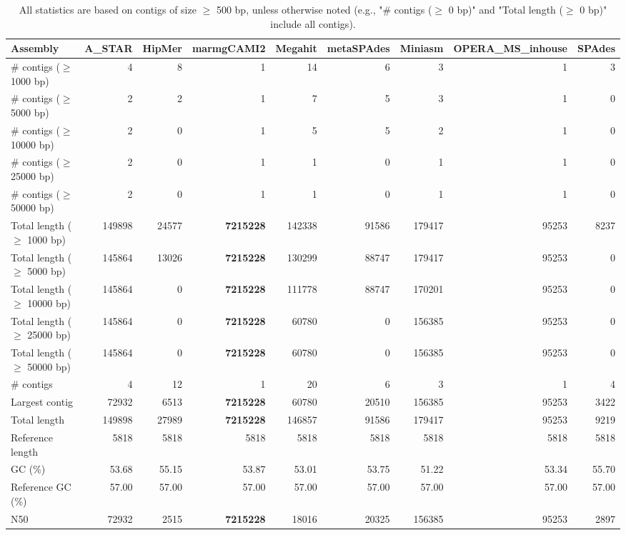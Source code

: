 \documentclass[12pt,a4paper]{article}
\begin{document}
\begin{table}[ht]
\begin{center}
\caption{All statistics are based on contigs of size $\geq$ 500 bp, unless otherwise noted (e.g., "\# contigs ($\geq$ 0 bp)" and "Total length ($\geq$ 0 bp)" include all contigs).}
\begin{tabular}{|l*{8}{|r}|}
\hline
Assembly & A\_STAR & HipMer & marmgCAMI2 & Megahit & metaSPAdes & Miniasm & OPERA\_MS\_inhouse & SPAdes \\ \hline
\# contigs ($\geq$ 1000 bp) & 4 & 8 & 1 & 14 & 6 & 3 & 1 & 3 \\ \hline
\# contigs ($\geq$ 5000 bp) & 2 & 2 & 1 & 7 & 5 & 3 & 1 & 0 \\ \hline
\# contigs ($\geq$ 10000 bp) & 2 & 0 & 1 & 5 & 5 & 2 & 1 & 0 \\ \hline
\# contigs ($\geq$ 25000 bp) & 2 & 0 & 1 & 1 & 0 & 1 & 1 & 0 \\ \hline
\# contigs ($\geq$ 50000 bp) & 2 & 0 & 1 & 1 & 0 & 1 & 1 & 0 \\ \hline
Total length ($\geq$ 1000 bp) & 149898 & 24577 & {\bf 7215228} & 142338 & 91586 & 179417 & 95253 & 8237 \\ \hline
Total length ($\geq$ 5000 bp) & 145864 & 13026 & {\bf 7215228} & 130299 & 88747 & 179417 & 95253 & 0 \\ \hline
Total length ($\geq$ 10000 bp) & 145864 & 0 & {\bf 7215228} & 111778 & 88747 & 170201 & 95253 & 0 \\ \hline
Total length ($\geq$ 25000 bp) & 145864 & 0 & {\bf 7215228} & 60780 & 0 & 156385 & 95253 & 0 \\ \hline
Total length ($\geq$ 50000 bp) & 145864 & 0 & {\bf 7215228} & 60780 & 0 & 156385 & 95253 & 0 \\ \hline
\# contigs & 4 & 12 & 1 & 20 & 6 & 3 & 1 & 4 \\ \hline
Largest contig & 72932 & 6513 & {\bf 7215228} & 60780 & 20510 & 156385 & 95253 & 3422 \\ \hline
Total length & 149898 & 27989 & {\bf 7215228} & 146857 & 91586 & 179417 & 95253 & 9219 \\ \hline
Reference length & 5818 & 5818 & 5818 & 5818 & 5818 & 5818 & 5818 & 5818 \\ \hline
GC (\%) & 53.68 & 55.15 & 53.87 & 53.01 & 53.75 & 51.22 & 53.34 & 55.70 \\ \hline
Reference GC (\%) & 57.00 & 57.00 & 57.00 & 57.00 & 57.00 & 57.00 & 57.00 & 57.00 \\ \hline
N50 & 72932 & 2515 & {\bf 7215228} & 18016 & 20325 & 156385 & 95253 & 2897 \\ \hline

\end{tabular}
\end{center}
\end{table}
\end{document}
